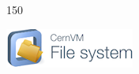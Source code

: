 \begin{titlepage}
\begin{center}
\begin{textblock}{150}
\begin{figure}
\begin{minipage}[r]{0.2 \textwidth}
\end{minipage}    
\end{figure}
\end{textblock}


\vspace*{20mm}


\vfill
\version

\vfill
\large
\includegraphics[scale=0.7]{figures/cernvmfs-logo}
\setlength{\parindent}{\backupparindent}
\end{center}
\end{titlepage}